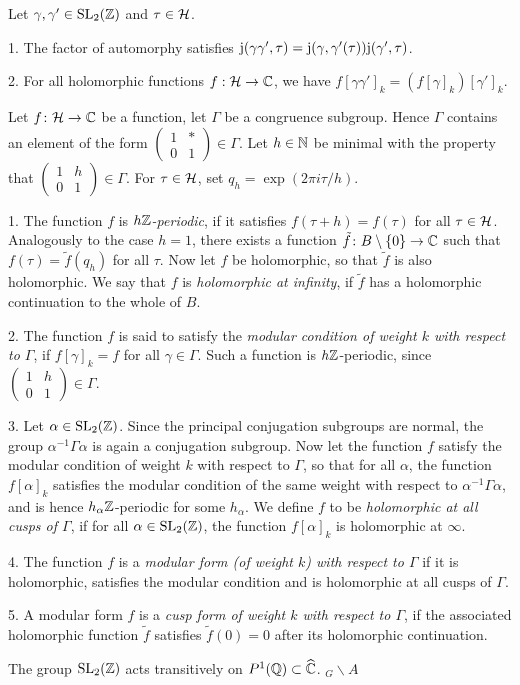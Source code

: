 \begin{remark}
 Let $\gamma,\gamma'\in\operatorname{SL}_2(\mathbb{Z})$ and $\tau\in\mathcal{H}$.
 
 1. The factor of automorphy satisfies $\mathrm{j}(\gamma\gamma',\tau) = \mathrm{j}(\gamma,\gamma'(\tau))\mathrm{j}(\gamma',\tau)$.
 
 2. For all holomorphic functions $f:\mathcal{H}\to\mathbb{C}$, we have $f[\gamma\gamma']_k=(f[\gamma]_k)[\gamma']_k$.
\end{remark}

\begin{defi} Let $f\colon \mathcal{H} \to \mathbb{C}$ be a function, let $\Gamma$ be a congruence subgroup. Hence $\Gamma$ contains an element of the form $\left(\begin{smallmatrix}1 & *\\0 & 1\end{smallmatrix}\right)\in\Gamma$. Let $h\in\mathbb{N}$ be minimal with the property that $\left(\begin{smallmatrix}1 & h\\0 & 1\end{smallmatrix}\right)\in\Gamma$. For $\tau\in\mathcal{H}$, set $q_h=\exp(2\pi i\tau/h)$.

  1. The function $f$ is \emph{$h\mathbb{Z}$-periodic}, if it satisfies $f(\tau + h) = f(\tau)$ for all $\tau \in \mathcal{H}$. Analogously to the case $h=1$, there exists a function $\tilde f\colon B\setminus \{0\} \to \mathbb{C}$ such that $f(\tau)=\tilde f(q_h)$ for all $\tau$. Now let $f$ be holomorphic, so that $\tilde f$ is also holomorphic. We say that $f$ is \emph{holomorphic at infinity}, if $\tilde f$ has a holomorphic continuation to the whole of $B$.
  
  2. The function $f$ is said to satisfy the \emph{modular condition of weight $k$ with respect to $\Gamma$}, if $f[\gamma]_k=f$ for all $\gamma \in \Gamma$. Such a function is $h\mathbb{Z}$-periodic, since $\left(\begin{smallmatrix}1 & h\\0 & 1\end{smallmatrix}\right)\in\Gamma$.
  
  3. Let $\alpha\in\operatorname{SL}_2(\mathbb{Z})$. Since the principal conjugation subgroups are normal, the group $\alpha^{-1}\Gamma\alpha$ is again a conjugation subgroup. Now let the function $f$ satisfy the modular condition of weight $k$ with respect to $\Gamma$, so that for all $\alpha$, the function $f[\alpha]_k$ satisfies the modular condition of the same weight with respect to $\alpha^{-1}\Gamma\alpha$, and is hence $h_\alpha\mathbb{Z}$-periodic for some $h_\alpha$. We define $f$ to be \emph{holomorphic at all cusps of $\Gamma$}, if for all $\alpha\in\operatorname{SL}_2(\mathbb{Z})$, the function $f[\alpha]_k$ is holomorphic at $\infty$.
  
  4. The function $f$ is a \emph{modular form (of weight $k$) with respect to $\Gamma$} if it is holomorphic, satisfies the modular condition and is holomorphic at all cusps of $\Gamma$.
  
  5. A modular form $f$ is a \emph{cusp form of weight $k$ with respect to $\Gamma$}, if the associated holomorphic function $\tilde{f}$ satisfies $\tilde{f}(0)=0$ after its holomorphic continuation. 
\end{defi}

\begin{remark}
  The group $\operatorname{SL}_2(\mathbb{Z})$ acts transitively on $P^1(\mathbb{Q})\subset\widehat{\mathbb{C}}$. $_G\backslash A$ 
\end{remark}





